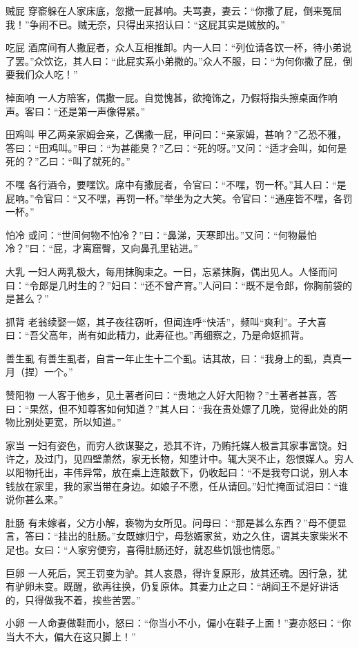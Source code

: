 \documentclass[12pt,UTF8]{ctexbook}
\begin{document}
贼屁
穿窬躲在人家床底，忽撒一屁甚响。夫骂妻，妻云：“你撒了屁，倒来冤屈我！”争闹不已。贼无奈，只得出来招认曰：“这屁其实是贼放的。”

吃屁
酒席间有人撒屁者，众人互相推卸。内一人曰：“列位请各饮一杯，待小弟说了罢。”众饮讫，其人曰：“此屁实系小弟撒的。”众人不服，曰：“为何你撒了屁，倒要我们众人吃！”

棹面响
一人方陪客，偶撒一屁。自觉愧甚，欲掩饰之，乃假将指头擦桌面作响声。客曰：“还是第一声像得紧。”

田鸡叫
甲乙两亲家姆会亲，乙偶撒一屁，甲问曰：“亲家姆，甚响？”乙恐不雅，答曰：“田鸡叫。”甲曰：“为甚能臭？”乙曰：“死的呀。”又问：“适才会叫，如何是死的？”乙曰：“叫了就死的。”

不嘿
各行酒令，要嘿饮。席中有撒屁者，令官曰：“不嘿，罚一杯。”其人曰：“是屁响。”令官曰：“又不嘿，再罚一杯。”举坐为之大笑。令官曰：“通座皆不嘿，各罚一杯。”

怕冷
或问：“世间何物不怕冷？”曰：“鼻涕，天寒即出。”又问：“何物最怕冷？”曰：“屁，才离窟臀，又向鼻孔里钻进。”

大乳
一妇人两乳极大，每用抹胸束之。一日，忘紧抹胸，偶出见人。人怪而问曰：“令郎是几时生的？”妇曰：“还不曾产育。”人问曰：“既不是令郎，你胸前袋的是甚么？”

抓背
老翁续娶一妪，其子夜往窃听，但闻连呼“快活”，频叫“爽利”。子大喜曰：“吾父高年，尚有如此精力，此寿征也。”再细察之，乃是命妪抓背。

善生虱
有善生虱者，自言一年止生十二个虱。诘其故，曰：“我身上的虱，真真一月（捏）一个。”

赞阳物
一人客于他乡，见土著者问曰：“贵地之人好大阳物？”土著者甚喜，答曰：“果然，但不知尊客如何知道？”其人曰：“我在贵处嫖了几晚，觉得此处的阴物比别处更宽，所以知道。”

家当
一妇有姿色，而穷人欲谋娶之，恐其不许，乃贿托媒人极言其家事富饶。妇许之，及过门，见四壁萧然，家无长物，知堕计中。辄大哭不止，怨恨媒人。穷人以阳物托出，丰伟异常，放在桌上连敲数下，仍收起曰：“不是我夸口说，别人本钱放在家里，我的家当带在身边。如娘子不愿，任从请回。”妇忙掩面试泪曰：“谁说你甚么来。”

肚肠
有未嫁者，父方小解，亵物为女所见。问母曰：“那是甚么东西？”母不便显言，答曰：“挂出的肚肠。”女既嫁归宁，母愁婿家贫，劝之久住，谓其夫家柴米不足也。女曰：“人家穷便穷，喜得肚肠还好，就忍些饥饿也情愿。”

巨卵
一人死后，冥王罚变为驴。其人哀恳，得许复原形，放其还魂。因行急，犹有驴卵未变。既醒，欲再往换，仍复原体。其妻力止之曰：“胡阎王不是好讲话的，只得做我不着，挨些苦罢。”

小卵
一人命妻做鞋而小，怒曰：“你当小不小，偏小在鞋子上面！”妻亦怒曰：“你当大不大，偏大在这只脚上！”
\end{document}

